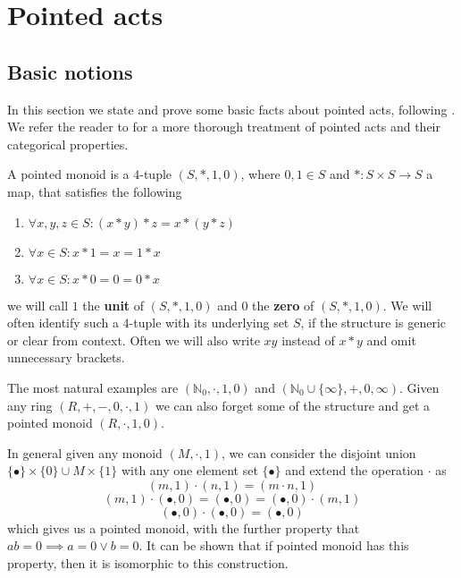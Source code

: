 \chapter{Pointed acts}
\section{Basic notions}
    In this section we state and prove some basic facts about pointed acts, following \cite{Kilp00}. We refer the reader to \cite{Kilp00} for a more thorough treatment of pointed acts and their categorical properties.
\begin{definition}
    A pointed monoid is a $4$-tuple $(S,\ast,1,0)$, where $0,1\in S$ and $\ast: S\times S \to S$ a map, that satisfies the following
    \begin{enumerate}
        \item $\forall x,y,z\in S: (x\ast y)\ast z = x\ast(y\ast z)$
        \item $\forall x\in S: x\ast 1 = x = 1\ast x$
        \item $\forall x\in S: x\ast 0 = 0 = 0\ast x$
    \end{enumerate}
    we will call $1$ the \textbf{unit} of $(S,\ast,1,0)$ and $0$ the \textbf{zero} of $(S,\ast,1,0)$. We will often identify
    such a $4$-tuple with its underlying set $S$, if the structure is generic or clear from context. Often we will also write
    $xy$ instead of $x\ast y$ and omit unnecessary brackets.
\end{definition}
\begin{example}
    The most natural examples are $(\mathbb{N}_0, \cdot, 1,0)$ and $(\mathbb{N}_0\cup\{\infty\}, +,0,\infty)$. Given any ring $(R,+,-,0,\cdot,1)$ 
    we can also forget some of the structure and get a pointed monoid $(R,\cdot,1,0)$.  
\end{example}
\begin{example}
    In general given any monoid $(M,\cdot,1)$, we can consider the disjoint union $\{\bullet\}\times\{0\}\cup M\times\{1\}$ with any one element set
    $\{\bullet\}$ and extend the operation $\cdot$ as
    \[
        (m,1)\cdot(n,1) = (m\cdot n,1)
    \]
    \[
        (m,1)\cdot(\bullet, 0) = (\bullet, 0) = (\bullet,0)\cdot(m,1)
    \]
    \[
        (\bullet,0)\cdot(\bullet,0) = (\bullet,0)
    \]
    which gives us a pointed monoid, with the further property that $ab=0 \implies a=0 \lor b=0$. It can be shown that if pointed monoid 
    has this property, then it is isomorphic to this construction.
\end{example}

